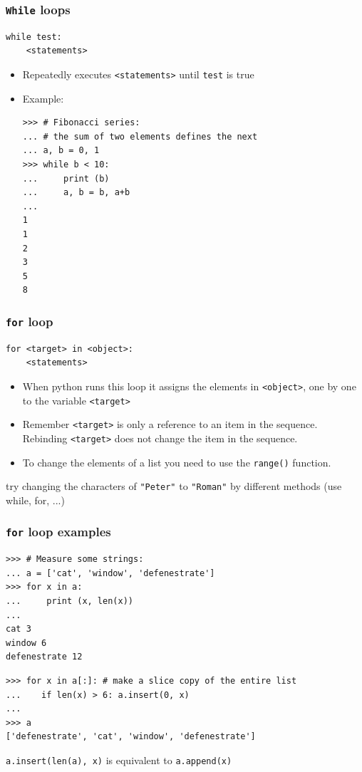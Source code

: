 \documentclass{beamer}
\begin{document}
\begin{frame}[containsverbatim]
\frametitle{\texttt{While} loops}
\begin{lstlisting}
while test:
	<statements>
\end{lstlisting}
\begin{itemize}
\item  Repeatedly executes \texttt{<statements>} until \texttt{test} is true
\item Example:
\begin{lstlisting}
>>> # Fibonacci series:
... # the sum of two elements defines the next
... a, b = 0, 1
>>> while b < 10:
...     print (b)
...     a, b = b, a+b
...
1
1
2
3
5
8
\end{lstlisting}
\end{itemize}
\end{frame}

\begin{frame}[containsverbatim]
\frametitle{\texttt{for} loop}
\begin{lstlisting}
for <target> in <object>:
	<statements>
\end{lstlisting}
\begin{itemize}
\item When python runs this loop it assigns the elements in \texttt{<object>}, one by one to the variable \texttt{<target>}
\item Remember \texttt{<target>} is only a reference to an item in the sequence. Rebinding \texttt{<target>} does not change the item in the sequence.
\item To change the elements of a list you need to use the \texttt{range()} function.
\end{itemize}
\begin{example}
try changing the characters of \texttt{"Peter"} to \texttt{"Roman"} by different methods (use while, for, ...)
\end{example}
\end{frame}

\begin{frame}[containsverbatim]
\frametitle{\texttt{for} loop examples}
\begin{lstlisting}
>>> # Measure some strings:
... a = ['cat', 'window', 'defenestrate']
>>> for x in a:
...     print (x, len(x))
...
cat 3
window 6
defenestrate 12
\end{lstlisting}
\begin{lstlisting}
>>> for x in a[:]: # make a slice copy of the entire list
...    if len(x) > 6: a.insert(0, x)
...
>>> a
['defenestrate', 'cat', 'window', 'defenestrate']
\end{lstlisting}
\texttt{a.insert(len(a), x)} is equivalent to \texttt{a.append(x)}
\end{frame}
\end{document}
